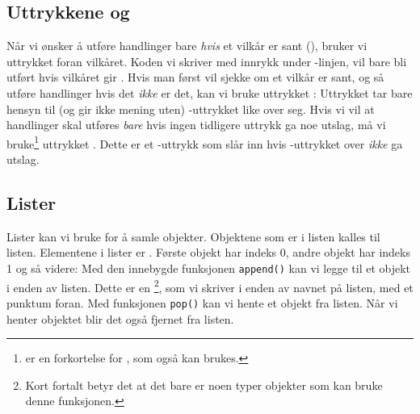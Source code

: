 \subsection{Uttrykkene  og }
Når vi ønsker å utføre handlinger bare \textsl{hvis} et vilkår er sant (), bruker vi uttrykket  foran vilkåret. Koden vi skriver med innrykk under -linjen, vil bare bli utført hvis vilkåret gir . 
Hvis man først vil sjekke om et vilkår er sant, og så utføre handlinger hvis det \textsl{ikke} er det, kan vi bruke uttrykket :
Uttrykket  tar bare hensyn til (og gir ikke mening uten) -uttrykket like over seg. Hvis vi vil at handlinger skal utføres \textsl{bare} hvis ingen tidligere  uttrykk ga noe utslag, må vi bruke\footnote{ er en forkortelse for , som også kan brukes.} uttrykket . Dette er et -uttrykk som slår inn hvis -uttrykket over \textsl{ikke} ga utslag.
\newpage
\subsection{Lister}
Lister kan vi bruke for å samle objekter. Objektene som er i listen kalles  til listen.
Elementene i lister er . Første objekt har indeks 0, andre objekt har indeks 1 og så videre:
Med den innebygde funksjonen \texttt{append()} kan vi legge til et objekt i enden av listen. Dette er en \footnote{Kort fortalt betyr det at det bare er noen typer objekter som kan bruke denne funksjonen.}, som vi skriver i enden av navnet på listen, med et punktum foran.
\newpage
Med funksjonen \texttt{pop()} kan vi hente et objekt fra listen. Når vi henter objektet blir det også fjernet fra listen.
 \vsk

